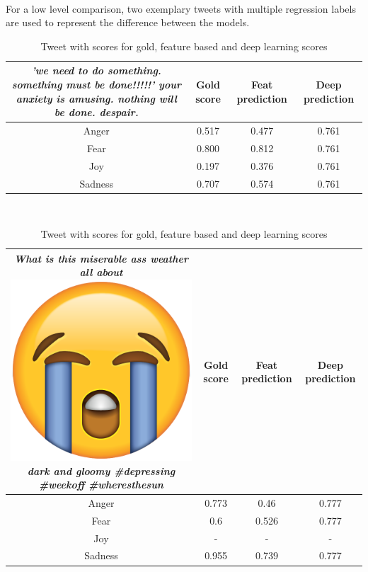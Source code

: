 \\
For a low level comparison, two exemplary tweets with multiple regression labels are used to represent the difference between the models.
\begin{table}[H]
\begin{tabular}{c|c|c|c|}
\parbox[t]{6cm}{\textit{'we need to do something. something must be done!!!!!' your anxiety is amusing. nothing will be done. despair.}} & Gold score & Feat prediction & Deep prediction \\ \hline
Anger & 0.517 & 0.477 & 0.761\\ \hline
Fear & 0.800 & 0.812 & 0.761\\ \hline
Joy & 0.197 & 0.376 & 0.761\\ \hline
Sadness & 0.707 & 0.574 & 0.761
\end{tabular}
\\[2ex]
\begin{tabular}{c|c|c|c|}
\parbox[t]{6cm}{\textit{What is this miserable ass weather all about \includegraphics[scale=0.015]{pictures/loudly_crying_face_emoji.png} dark and gloomy \#depressing \#weekoff \#wheresthesun}} & Gold score & Feat prediction & Deep prediction \\ \hline
Anger & 0.773 & 0.46 & 0.777\\ \hline
Fear & 0.6 & 0.526 & 0.777 \\ \hline
Joy & - & - & - \\ \hline
Sadness & 0.955 & 0.739 & 0.777
\end{tabular}
\caption{Tweet with scores for gold, feature based and deep learning scores}
\label{tab:predcomp}
\end{table}
